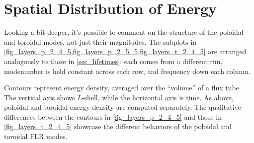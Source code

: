 \section{Spatial Distribution of Energy}
  \label{sec_layers}


Looking a bit deeper, it's possible to comment on the structure of the poloidal and toroidal modes, not just their magnitudes. The subplots in \cref{fig_layers_p_2_4_5,fig_layers_p_2_5_5,fig_layers_t_2_4_5} are arranged analogously to those in \cref{sec_lifetimes}: each comes from a different run, modenumber is held constant across each row, and frequency down each column. 

Contours represent energy density, averaged over the ``volume'' of a flux tube. The vertical axis shows $L$-shell, while the horizontal axis is time. As above, poloidal and toroidal energy density are computed separately. The qualitative differences between the contours in \cref{fig_layers_p_2_4_5} and those in \cref{fig_layers_t_2_4_5} showcase the different behaviors of the poloidal and toroidal FLR modes. 

